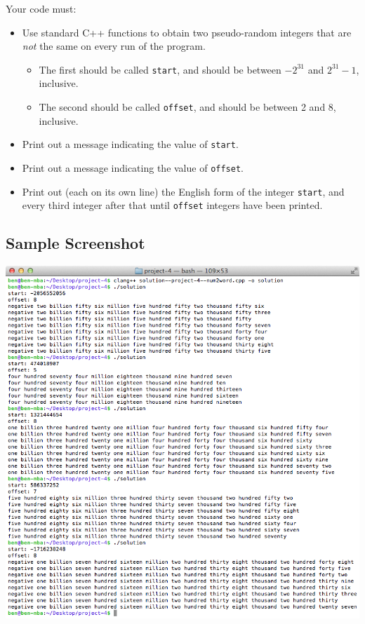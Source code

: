 \documentclass[12pt,letterpaper]{article}
\begin{document}
Your code must:
\begin{itemize}
  \item Use standard C++ functions to obtain two pseudo-random integers that
    are \textit{not} the same on every run of the program.
    \begin{itemize}
      \item The first should be called \lstinline{start}, and should be between
        $-2^{31}$ and $2^{31}-1$, inclusive.
      \item The second should be called \lstinline{offset}, and should be
        between 2 and 8, inclusive.
    \end{itemize}
  \item Print out a message indicating the value of \lstinline{start}.
  \item Print out a message indicating the value of \lstinline{offset}.
  \item Print out (each on its own line) the English form of the integer
    \lstinline{start}, and every third integer after that until
    \lstinline{offset} integers have been printed.
\end{itemize}


\filbreak
\subsection*{Sample Screenshot}
\includegraphics[width=\linewidth]{sample-output.png}
\end{document}
